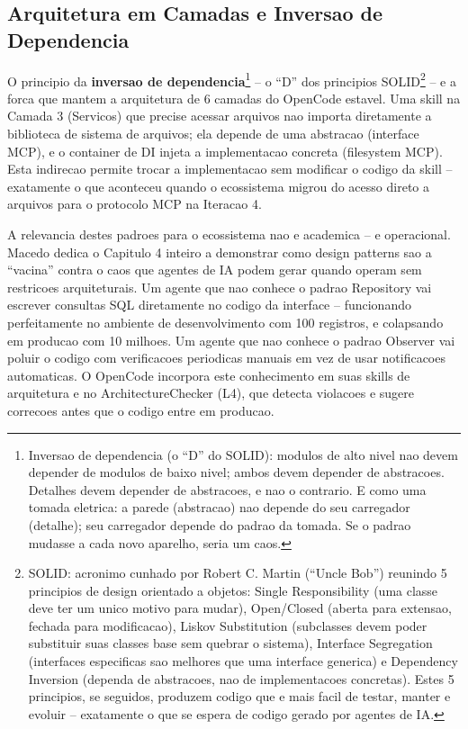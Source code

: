\documentclass[12pt,a4paper,oneside,sumario=tradicional,chapter=TITLE,section=TITLE,subsection=TITLE,english,brazil]{abntex2}
\begin{document}
\subsection{Arquitetura em Camadas e Inversao de Dependencia}

O principio da \textbf{inversao de dependencia}\footnote{Inversao de dependencia (o ``D'' do SOLID): modulos de alto nivel nao devem depender de modulos de baixo nivel; ambos devem depender de abstracoes. Detalhes devem depender de abstracoes, e nao o contrario. E como uma tomada eletrica: a parede (abstracao) nao depende do seu carregador (detalhe); seu carregador depende do padrao da tomada. Se o padrao mudasse a cada novo aparelho, seria um caos.} -- o ``D'' dos principios SOLID\footnote{SOLID: acronimo cunhado por Robert C. Martin (``Uncle Bob'') reunindo 5 principios de design orientado a objetos: Single Responsibility (uma classe deve ter um unico motivo para mudar), Open/Closed (aberta para extensao, fechada para modificacao), Liskov Substitution (subclasses devem poder substituir suas classes base sem quebrar o sistema), Interface Segregation (interfaces especificas sao melhores que uma interface generica) e Dependency Inversion (dependa de abstracoes, nao de implementacoes concretas). Estes 5 principios, se seguidos, produzem codigo que e mais facil de testar, manter e evoluir -- exatamente o que se espera de codigo gerado por agentes de IA.} -- e a forca que mantem a arquitetura de 6 camadas do OpenCode estavel. Uma skill na Camada 3 (Servicos) que precise acessar arquivos nao importa diretamente a biblioteca de sistema de arquivos; ela depende de uma abstracao (interface MCP), e o container de DI injeta a implementacao concreta (filesystem MCP). Esta indirecao permite trocar a implementacao sem modificar o codigo da skill -- exatamente o que aconteceu quando o ecossistema migrou do acesso direto a arquivos para o protocolo MCP na Iteracao 4.

A relevancia destes padroes para o ecossistema nao e academica -- e operacional. Macedo \cite{macedo2026engenharia} dedica o Capitulo 4 inteiro a demonstrar como design patterns sao a ``vacina'' contra o caos que agentes de IA podem gerar quando operam sem restricoes arquiteturais. Um agente que nao conhece o padrao Repository vai escrever consultas SQL diretamente no codigo da interface -- funcionando perfeitamente no ambiente de desenvolvimento com 100 registros, e colapsando em producao com 10 milhoes. Um agente que nao conhece o padrao Observer vai poluir o codigo com verificacoes periodicas manuais em vez de usar notificacoes automaticas. O OpenCode incorpora este conhecimento em suas skills de arquitetura e no ArchitectureChecker (L4), que detecta violacoes e sugere correcoes antes que o codigo entre em producao.
\end{document}
